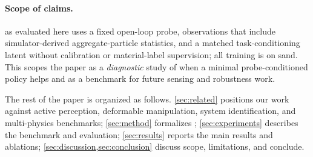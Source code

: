 \paragraph{Scope of claims.}
\PTA{} as evaluated here uses a fixed open-loop probe, observations that include simulator-derived aggregate-particle statistics, and a matched task-conditioning latent without calibration or material-label supervision; all training is on sand. This scopes the paper as a \emph{diagnostic} study of when a minimal probe-conditioned policy helps and as a benchmark for future sensing and robustness work.

The rest of the paper is organized as follows. \cref{sec:related} positions our work against active perception, deformable manipulation, system identification, and multi-physics benchmarks; \cref{sec:method} formalizes \PTA{}; \cref{sec:experiments} describes the benchmark and evaluation; \cref{sec:results} reports the main results and ablations; \cref{sec:discussion,sec:conclusion} discuss scope, limitations, and conclude.
